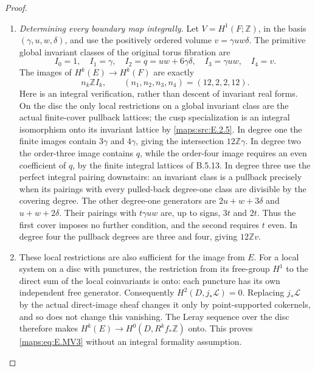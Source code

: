 \begin{proof}
\begin{enumerate}[label=\arabic*.,leftmargin=*]
\item \emph{Determining every boundary map integrally.}
Let $V=H^1(F;\mathbb Z)$, in the basis $(\gamma,u,w,\delta)$,
and use the positively ordered volume
$v=\gamma u w\delta$. The primitive global invariant classes
of the original torus fibration are
\[
 I_0=1,\quad I_1=\gamma,\quad
 I_2=q=uw+6\gamma\delta,\quad
 I_3=\gamma uw,\quad I_4=v.
\]
The images of $H^k(E)\to H^k(F)$ are exactly
\[
 n_k\mathbb Z I_k,\qquad
 (n_1,n_2,n_3,n_4)=(12,2,2,12).
 \tag{E.MV3}\label{maps:eq:E.MV3}
\]
Here is an integral verification, rather than descent of invariant
real forms. On the disc the only local restrictions on a global
invariant class are the actual finite-cover pullback lattices;
the cusp specialization is an integral isomorphism onto its
invariant lattice by \ref{maps:src:E.2.5}. In degree one the finite images
contain $3\gamma$ and $4\gamma$, giving the intersection
$12\mathbb Z\gamma$. In degree two the order-three image
contains $q$, while the order-four image requires an even
coefficient of $q$, by the finite integral lattices of B.5.13.
In degree three use the perfect integral pairing downstairs:
an invariant class is a pullback precisely when its pairings
with every pulled-back degree-one class are divisible by the
covering degree. The other degree-one generators are
$2u+w+3\delta$ and $u+w+2\delta$. Their pairings with
$t\gamma uw$ are, up to signs, $3t$ and $2t$.
Thus the first cover imposes no further condition, and the
second requires $t$ even. In degree four the pullback degrees
are three and four, giving $12\mathbb Z v$.

\item These local restrictions are also sufficient for the image
from $E$. For a local system on a disc with punctures, the
restriction from its free-group $H^1$ to the direct sum of
the local coinvariants is onto: each puncture has its own
independent free generator. Consequently
$H^2(D,j_*\mathcal L)=0$. Replacing $j_*\mathcal L$ by the
actual direct-image sheaf changes it only by point-supported
cokernels, and so does not change this vanishing.
The Leray sequence over the disc therefore makes
$H^k(E)\to H^0(D,R^kf_*\mathbb Z)$ onto. This proves
\eqref{maps:eq:E.MV3} without an integral formality assumption.


\end{enumerate}
\end{proof}
